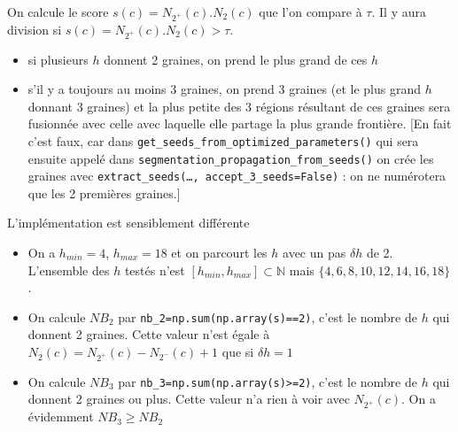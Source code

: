 \documentclass{article}
\begin{document}
\begin{itemize}
\begin{itemize}
On calcule le score $s(c) = N_{2^{+}}(c) . N_2(c)$ que l'on compare \`a $\tau$. Il y aura division si $s(c) = N_{2^{+}}(c) . N_2(c) > \tau$.
\begin{itemize}
\itemsep -0.5ex
\item si plusieurs $h$ donnent 2 graines, on prend le plus grand de ces $h$
\item s'il y a toujours au moins 3 graines, on prend 3 graines (et le plus grand $h$ donnant 3 graines) et la plus petite des 3 r\'egions r\'esultant de ces graines sera fusionn\'ee avec celle avec laquelle elle partage la plus grande fronti\`ere. [En fait c'est faux, car dans \texttt{get\_seeds\_from\_optimized\_parameters()} qui sera ensuite appel\'e dans \texttt{segmentation\_propagation\_from\_seeds()} on cr\'ee les graines avec \texttt{extract\_seeds(\ldots, accept\_3\_seeds=False)} : on ne num\'erotera que les 2 premi\`eres graines.] 
\end{itemize}

L'impl\'ementation est sensiblement diff\'erente
\begin{itemize}
\itemsep -0.5ex
\item On a $h_{min}=4$, $h_{max}=18$ et on parcourt les $h$ avec un pas  $\delta h$ de 2. L'ensemble des $h$ test\'es n'est $[h_{min}, h_{max}] \subset \mathbb{N}$ mais $\{4, 6, 8, 10, 12, 14, 16, 18\}$.
\item On calcule $NB_2$ par \verb|nb_2=np.sum(np.array(s)==2)|, c'est le nombre de $h$ qui donnent 2 graines. Cette valeur n'est \'egale \`a
$N_2(c) =  N_{2^{+}}(c) - N_{2^{-}}(c) +1$ que si $\delta h =1$
\item On calcule $NB_3$ par \verb|nb_3=np.sum(np.array(s)>=2)|, c'est le nombre de $h$ qui donnent 2 graines ou plus. Cette valeur n'a rien \`a voir avec $N_{2^{+}}(c)$. On a \'evidemment $NB_3 \geq NB_2$
\end{itemize}


\end{itemize}
\end{itemize}
\end{document}
